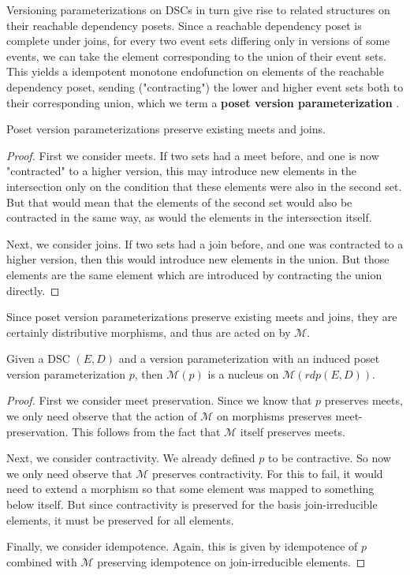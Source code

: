 \documentclass[hoptionsi,review,format=sigplan]{acmart}
\theoremstyle{definition}
\newcommand{\Mcc}{\mathcal{M}}
\begin{document}
Versioning parameterizations on DSCs in turn give rise to related structures on their reachable dependency posets. Since a reachable dependency poset is complete under joins, for every two event sets differing only in versions of some events, we can take the element corresponding to the union of their event sets. This yields a idempotent monotone endofunction on elements of the reachable dependency poset, sending ("contracting") the lower and higher event sets both to their corresponding union, which we term a \textbf{poset version parameterization} .

\begin{lemma}
Poset version parameterizations preserve existing meets and joins.
\end{lemma}
\begin{proof}
First we consider meets. If two sets had a meet before, and one is now "contracted" to a higher version, this may introduce new elements in the intersection only on the condition that these elements were also in the second set. But that would mean that the elements of the second set would also be contracted in the same way, as would the elements in the intersection itself.

Next, we consider joins. If two sets had a join before, and one was contracted to a higher version, then this would introduce new elements in the union. But those elements are the same element which are introduced by contracting the union directly.
\end{proof}

Since poset version parameterizations preserve existing meets and joins, they are certainly distributive morphisms, and thus are acted on by \(\Mcc\).

\begin{theorem} \label{dsc_nucleus}
Given a DSC \((E,D)\) and a version parameterization with an induced poset version parameterization \(p\), then \(\Mcc(p)\) is a nucleus on \(\Mcc(rdp(E,D))\).
\end{theorem}
\begin{proof}
First we consider meet preservation. Since we know that \(p\) preserves meets, we only need observe that the action of \(\Mcc\) on morphisms preserves meet-preservation. This follows from the fact that \(\Mcc\) itself preserves meets.


Next, we consider contractivity. We already defined \(p\) to be contractive. So now we only need observe that \(\Mcc\) preserves contractivity. For this to fail, it would need to extend a morphism so that some element was mapped to something below itself. But since contractivity is preserved for the basis join-irreducible elements, it must be preserved for all elements.

Finally, we consider idempotence. Again, this is given by idempotence of \(p\) combined with \(\Mcc\) preserving idempotence on join-irreducible elements.
\end{proof}
\end{document}
